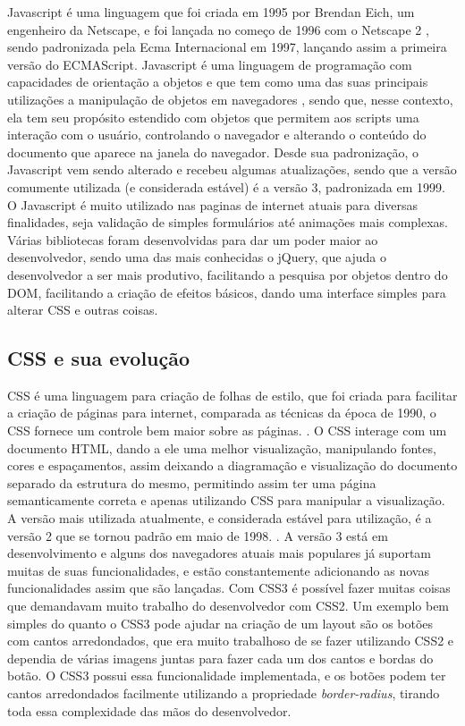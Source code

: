 Javascript é uma linguagem que foi criada em 1995 por Brendan Eich,
um engenheiro da Netscape, e foi lançada no começo de 1996 com o
Netscape 2 \cite{mdnjavascript}, sendo padronizada pela Ecma
Internacional em 1997, lançando assim a primeira versão do ECMAScript.
Javascript é uma linguagem de programação com capacidades de orientação a objetos e que tem como uma das suas principais
utilizações a manipulação de objetos em navegadores \cite{flanagan2006javascript}, sendo que, nesse contexto,
ela tem seu propósito estendido com objetos que permitem aos scripts uma interação com o usuário,
controlando o navegador e alterando o conteúdo do documento que aparece na janela do navegador.
Desde sua padronização, o Javascript vem sendo alterado e
recebeu algumas atualizações, sendo que a versão comumente
utilizada (e considerada estável) é a versão 3, padronizada em 1999.
O Javascript é muito utilizado nas paginas de internet atuais para
diversas finalidades, seja validação de simples formulários até
animações mais complexas. Várias bibliotecas foram desenvolvidas para
dar um poder maior ao desenvolvedor, sendo uma das mais conhecidas o
jQuery, que ajuda o desenvolvedor a ser mais produtivo, facilitando a
pesquisa por objetos dentro do DOM, facilitando a criação de efeitos
básicos, dando uma interface simples para alterar CSS e outras coisas.

\subsection{CSS e sua evolução}

CSS é uma linguagem para criação de folhas de estilo, que foi criada
para facilitar a criação de páginas para internet, comparada as técnicas da época de
1990, o CSS fornece um controle bem maior sobre as páginas. \cite{schmitt2009css}.
O CSS interage com um documento HTML, dando a ele uma melhor visualização, manipulando
fontes, cores e espaçamentos, assim deixando a diagramação e visualização do documento
separado da estrutura do mesmo, permitindo assim ter uma página semanticamente correta
e apenas utilizando CSS para manipular a visualização.
A versão mais utilizada atualmente, e considerada estável para utilização, é a versão 2
que se tornou padrão em maio de 1998. \cite{zeldman2009designing}.
A versão 3 está em desenvolvimento e alguns dos navegadores atuais mais populares
já suportam muitas de suas funcionalidades, e estão constantemente
adicionando as novas funcionalidades assim que são lançadas.
Com CSS3 é possível fazer muitas coisas que demandavam muito trabalho
do desenvolvedor com CSS2. Um exemplo bem simples do quanto o CSS3
pode ajudar na criação de um layout são os botões com cantos
arredondados, que era muito trabalhoso de se fazer utilizando CSS2 e
dependia de várias imagens juntas para fazer cada um dos cantos e
bordas do botão. O CSS3 possui essa funcionalidade implementada, e os
botões podem ter cantos arredondados facilmente utilizando a
propriedade \textit{border-radius}, tirando toda essa complexidade das mãos do
desenvolvedor.

